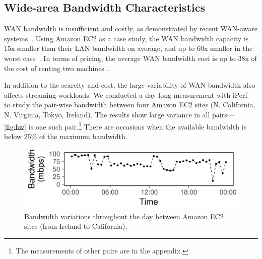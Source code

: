 

\subsection{Wide-area Bandwidth Characteristics}
\label{sec:wide-area-bandwidth}

WAN bandwidth is insufficient and costly, as demonstrated by recent WAN-aware
systems~\cite{hsieh17gaia, pu2015low, vulimiri2015wananlytics,
  vulimiri2015global}. Using Amazon EC2 as a case study, the WAN bandwidth
capacity is 15x smaller than their LAN bandwidth on average, and up to 60x
smaller in the worst case~\cite{hsieh17gaia}. In terms of pricing, the average
WAN bandwidth cost is up to 38x of the cost of renting two
machines~\cite{amazon2017pricing, hsieh17gaia}.

In addition to the scarcity and cost, the large variability of WAN bandwidth
also affects streaming workloads. We conducted a day-long measurement with
iPerf~\cite{iperf3} to study the pair-wise bandwidth between four Amazon EC2
sites (N. California, N. Virginia, Tokyo, Ireland).  The results show large
variance in all pairs--- \autoref{fig:bw} is one such pair.\footnote{The
  measurements of other pairs are in the appendix.} There are occasions when the
available bandwidth is below 25\% of the maximum bandwidth.

\begin{figure}
  \centering
  \includegraphics[width=0.9\linewidth]{figures/aws-variation.pdf}
  \caption{Bandwidth variations throughout the day between Amazon EC2 sites
    (from Ireland to California).}
  \label{fig:bw}
\end{figure}

